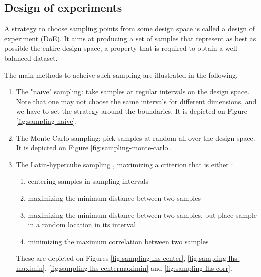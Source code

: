 \subsection{Design of experiments}

A strategy to choose sampling points from some design space is called a design of experiment (DoE). It aims at producing a set of samples that represent as best as possible the entire design space, a property that is required to obtain a well balanced dataset. 

The main methods to acheive such sampling are \cite{doe} illustrated in the following.
\begin{enumerate}
    \item The "naïve" sampling: take samples at regular intervals on the design space. Note that one may not choose the same intervals for different dimensions, and we have to set the strategy around the boundaries. It is depicted on Figure \ref{fig:sampling-naive}.
    \item The Monte-Carlo sampling: pick samples at random all over the design space. It is depicted on Figure \ref{fig:sampling-monte-carlo}.
    \item The Latin-hypercube sampling \cite{wiki-lhs}, maximizing a criterion that is either \cite{pydoe-docs}:
    \begin{enumerate}
        \item centering samples in sampling intervals
        \item maximizing the minimum distance between two samples
        \item maximizing the minimum distance between two samples, but place sample in a random location in its interval
        \item minimizing the maximum correlation between two samples
    \end{enumerate}
    These are depicted on Figures \ref{fig:sampling-lhs-center}, \ref{fig:sampling-lhs-maximin}, \ref{fig:sampling-lhs-centermaximin} and \ref{fig:sampling-lhs-corr}.
\end{enumerate}

